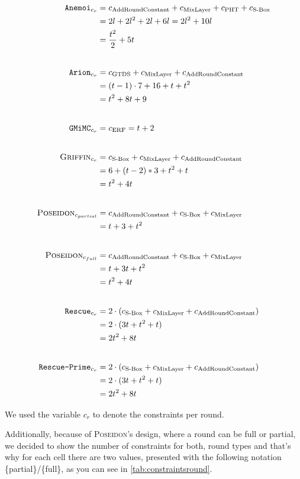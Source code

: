 \documentclass[12pt, a4paper]{report}
\begin{document}
\begin{align*}
  \texttt{Anemoi}_{c_r} & = c_{\text{AddRoundConstant}} + c_{\text{MixLayer}} + c_{\text{PHT}} + c_{\text{S-Box}} \\
    &= 2l + 2l^2 + 2l + 6l = 2l^2 + 10l \\
    &= \frac{t^2}{2} + 5t\\[20pt]
  \texttt{Arion}_{c_r} &= c_{\text{GTDS}} + c_{\text{MixLayer}} + c_{\text{AddRoundConstant}} \\
    &= (t-1) \cdot 7 + 16 + t + t^2 \\
    &= t^2 + 8t + 9\\[20pt]
  \texttt{GMiMC}_{c_r} &= c_{\text{ERF}} = t+2\\[20pt]
  \textsc{Griffin}_{c_r} &= c_{\text{S-Box}} + c_{\text{MixLayer}} + c_{\text{AddRoundConstant}} \\
    & = 6 + (t-2)*3 + t^2 + t \\
    & = t^2 + 4t\\[20pt]
  \textsc{Poseidon}_{c_{partial}} &= c_{\text{AddRoundConstant}} + c_{\text{S-Box}} + c_{\text{MixLayer}} \\
    &= t + 3 + t^2\\[20pt]
  \textsc{Poseidon}_{c_{full}} &= c_{\text{AddRoundConstant}} + c_{\text{S-Box}} + c_{\text{MixLayer}} \\ 
    &= t + 3t + t^2 \\
    &= t^2 + 4t\\[20pt]
  \texttt{Rescue}_{c_r} &= 2 \cdot (c_{\text{S-Box}} + c_{\text{MixLayer}} + c_{\text{AddRoundConstant}}) \\
    &= 2 \cdot (3t + t^2 + t) \\
    &= 2t^2 + 8t\\[20pt]
  \texttt{Rescue-Prime}_{c_r} &= 2 \cdot (c_{\text{S-Box}} + c_{\text{MixLayer}} + c_{\text{AddRoundConstant}}) \\
    &= 2 \cdot (3t + t^2 + t) \\
    &= 2t^2 + 8t
\end{align*}

We used the variable $c_r$ to denote the constraints per round.

Additionally, because of \textsc{Poseidon}'s design, where a round can be full or partial, we decided to show the number of constraints for both, round types and that's why for each cell there are two values, presented with the following notation \{partial\}/\{full\}, as you can see in \autoref{tab:constraintsround}.
\end{document}
